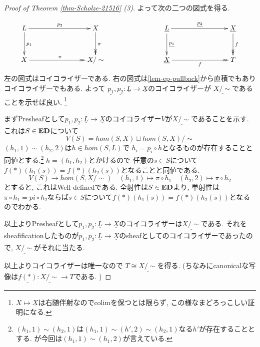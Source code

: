 \documentclass[dvipdfmx,a4paper,11pt]{article}
\theoremstyle{definition}
\begin{document}
\begin{proof}[Proof of Theorem \ref{thm-Scholze-21516} (3)]
よって次の二つの図式を得る.

\begin{equation*}
\xymatrix@C=80pt@R=30pt{
L\ar@{->}[r]^{p_2}\ar@{->}[d]^{p_1}
&X \ar@{->>}[d]^{\pi}
&
\underline{L}\ar@{->}[r]^{\underline{p_2}}
\ar@{->}[d]^{\underline{p_1}}
& \underline{X}\ar@{->>}[d]^{f}
\\
X \ar@{->>}[r]^{\pi}
&X/\sim
&
 \underline{X} \ar@{->>}[r]_{f}
& T
 \\   
}
\end{equation*}
左の図式はコイコライザーである. 
右の図式は\ref{lem-ep-pullback}から直積でもありコイコライザーでもある. 
よって
$\underline{p_1}, \underline{p_2} : \underline{L} \to \underline{X}$のコイコライザーが
$\underline{X/\sim}$であることを示せば良い. \footnote{$X \mapsto \underline{X}$は右随伴射なのでcolimを保つとは限らず, この様なまどろっこしい証明になる.}

まずPresheafとして$\underline{p_1}, \underline{p_2} : \underline{L} \to \underline{X}$のコイコライザー$V$が$\underline{X/\sim}$であることを示す. 
これは$S \in {\bf ED}$について
$$
V(S) =hom(S, \underline{X})\sqcup hom(S, \underline{X})/\sim
$$
$(h_1,1) \sim (h_2,2) $は$h \in hom(S,L)$で
$h_i = p_i \circ h $となるものが存在することと同値とする.\footnote{$(h_1,1) \sim (h_2,1)$は$(h_1,1) \sim (h',2) \sim (h_2,1)$なる$h'$が存在することとする. が今回は$(h_1,1)\sim (h_1,2)$が言えている. }
$h = (h_1, h_2)$とかけるので
任意の$s \in S$について$f(\ast)(h_1(s)) = f(\ast)(h_2(s))$となることと同値である. 
$$
V(S) \to hom(S,X/\sim)
\quad
(h_1,1) \mapsto \pi \circ h_1
\quad
(h_2,2) \mapsto \pi \circ h_2
$$
とすると, これはWell-definedである. 
全射性は$S \in {\bf ED}$より, 単射性は
$\pi \circ h_1 = pi \circ h_2$ならば$s \in S$について$f(\ast)(h_1(s)) = f(\ast)(h_2(s))$となるのでわかる. 

以上よりPresheafとして$\underline{p_1}, \underline{p_2} : \underline{L} \to \underline{X}$のコイコライザーは$\underline{X/\sim}$である.
それをsheafificationしたものが$\underline{p_1}, \underline{p_2} : \underline{L} \to \underline{X}$のsheafとしてのコイコライザーであったので, $\underline{X/\sim}$がそれに当たる.

以上よりコイコライザーは唯一なので
$T \cong \underline{X/\sim}$を得る. 
(ちなみにcanonicalな写像は$\underline{f(\ast)} : \underline{X/\sim} \to T$である. )

\end{proof}
\end{document}
